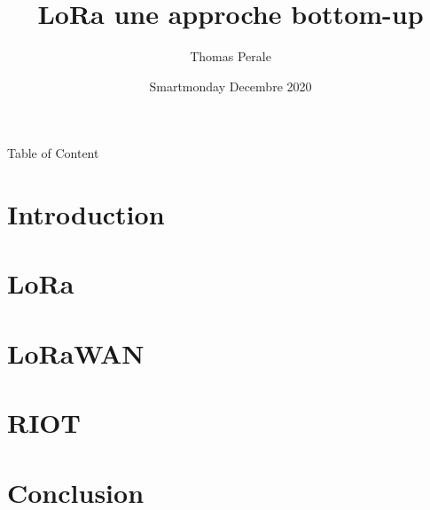 \documentclass{beamer}
\title{LoRa une approche bottom-up}
\subtitle{}
\author{Thomas Perale}
\date{Smartmonday Decembre 2020}
\begin{document}
\frame{\maketitle}

\begin{frame}{Table of Content}
    \tableofcontents
\end{frame}

\section{Introduction}



\section{LoRa}



\section{LoRaWAN}



\section{RIOT}



\section{Conclusion}



% 
\end{document}
